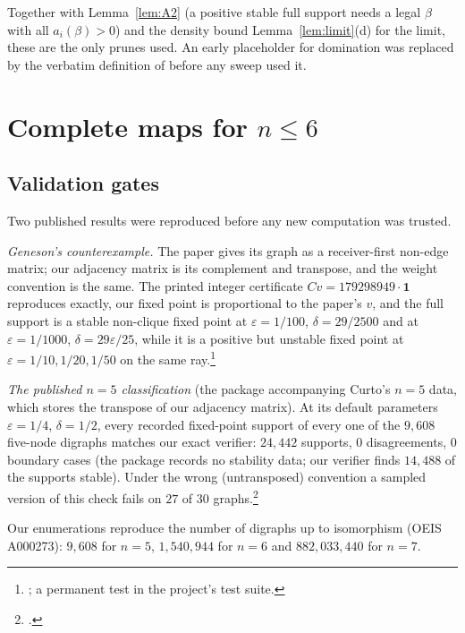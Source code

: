 \documentclass[11pt]{article}
\theoremstyle{definition}
\newcommand{\one}{\mathbf{1}}
\newcommand{\eps}{\varepsilon}
\begin{document}
Together with Lemma~\ref{lem:A2} (a positive stable full support needs a legal $\beta$ with all $a_i(\beta)>0$) and the
density bound Lemma~\ref{lem:limit}(d) for the limit, these are the only prunes used. An early placeholder for domination
was replaced by the verbatim definition of \cite{Curto2025} before any sweep used it.

\section{Complete maps for \texorpdfstring{$n\le6$}{n <= 6}}\label{sec:n6}

\subsection{Validation gates}
Two published results were reproduced before any new computation was trusted.

\emph{Geneson's counterexample.} The paper \cite{Geneson2026} gives its graph as a receiver-first non-edge matrix; our
adjacency matrix is its complement and transpose, and the weight convention is the same. The printed integer
certificate $Cv=179298949\cdot\one$ reproduces exactly, our fixed point is proportional to the paper's $v$, and the
full support is a stable non-clique fixed point at $\eps=1/100$, $\delta=29/2500$ and at $\eps=1/1000$,
$\delta=29\eps/25$, while it is a positive but unstable fixed point at $\eps=1/10,1/20,1/50$ on the same ray.\footnote{; a permanent test in the project's test suite.}

\emph{The published $n=5$ classification} (the package accompanying Curto's $n=5$ data, which stores the transpose of
our adjacency matrix). At its default parameters $\eps=1/4$, $\delta=1/2$, every recorded fixed-point support of every
one of the $9{,}608$ five-node digraphs matches our exact verifier: $24{,}442$ supports, $0$ disagreements, $0$ boundary
cases (the package records no stability data; our verifier finds $14{,}488$ of the supports stable). Under the wrong (untransposed) convention a sampled version of this check fails on
$27$ of $30$ graphs.\footnote{.}

Our enumerations reproduce the number of digraphs up to isomorphism (OEIS A000273): $9{,}608$ for $n=5$,
$1{,}540{,}944$ for $n=6$ and $882{,}033{,}440$ for $n=7$.
\end{document}
